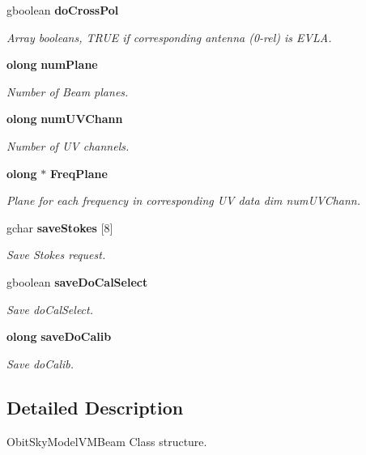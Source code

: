 \begin{CompactItemize}
gboolean {\bf do\-Cross\-Pol}
\begin{CompactList}\small\item\em Array booleans, TRUE if corresponding antenna (0-rel) is EVLA. \item\end{CompactList}\item 
{\bf olong} {\bf num\-Plane}
\begin{CompactList}\small\item\em Number of Beam planes. \item\end{CompactList}\item 
{\bf olong} {\bf num\-UVChann}
\begin{CompactList}\small\item\em Number of UV channels. \item\end{CompactList}\item 
{\bf olong} $\ast$ {\bf Freq\-Plane}
\begin{CompactList}\small\item\em Plane for each frequency in corresponding UV data dim num\-UVChann. \item\end{CompactList}\item 
gchar {\bf save\-Stokes} [8]
\begin{CompactList}\small\item\em Save Stokes request. \item\end{CompactList}\item 
gboolean {\bf save\-Do\-Cal\-Select}
\begin{CompactList}\small\item\em Save do\-Cal\-Select. \item\end{CompactList}\item 
{\bf olong} {\bf save\-Do\-Calib}
\begin{CompactList}\small\item\em Save do\-Calib. \item\end{CompactList}\end{CompactItemize}


\subsection{Detailed Description}
Obit\-Sky\-Model\-VMBeam Class structure. 



